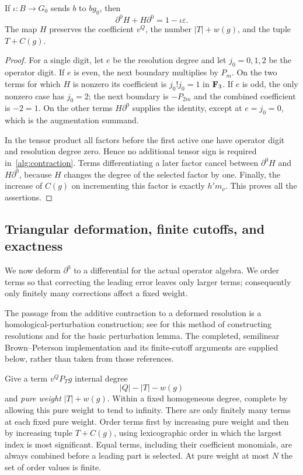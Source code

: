 \begin{lemma}\label{alg:additive-contraction}
If $\iota:B\to G_0$ sends $b$ to $bg_0$, then
\[
 \partial^0H+H\partial^0=1-\iota\varepsilon.
\]
The map $H$ preserves the coefficient $v^Q$, the number
$|T|+w(g)$, and the tuple $T+C(g)$.
\end{lemma}

\begin{proof}
For a single digit, let $e$ be the resolution degree and let
$j_0=0,1,2$ be the operator digit.  If $e$ is even, the next boundary
multiplies by $P_m$.  On the two terms for which $H$ is nonzero its
coefficient is $j_0!j_0=1$ in $\mathbf F_3$.  If $e$ is odd, the only nonzero
case has $j_0=2$; the next boundary is $-P_{2m}$ and the combined
coefficient is $-2=1$.  On the other terms $H\partial^0$ supplies the
identity, except at $e=j_0=0$, which is the augmentation summand.

In the tensor product all factors before the first active one have
operator digit and resolution degree zero.  Hence no additional tensor
sign is required in~\eqref{alg:contraction}.  Terms differentiating a
later factor cancel between $\partial^0H$ and $H\partial^0$, because
$H$ changes the degree of the selected factor by one.  Finally, the
increase of $C(g)$ on incrementing this factor is exactly $h'm_\nu$.
This proves all the assertions.
\end{proof}

\subsection{Triangular deformation, finite cutoffs, and exactness}

We now deform $\partial^0$ to a differential for the actual operator
algebra. We order terms so that correcting the leading error leaves only
larger terms; consequently only finitely many corrections affect a fixed
weight.

The passage from the additive contraction to a deformed resolution is
a homological-perturbation construction; see \cite{Lambe1991} for this
method of constructing resolutions and
\cite[Section~4.8.3, Theorem~51]{RubioSergeraert2013} for the basic
perturbation lemma.  The completed, semilinear Brown--Peterson
implementation and its finite-cutoff arguments are supplied below,
rather than taken from those references.

Give a term $v^QP_Tg$ internal degree
\begin{equation}\label{alg:dual-degree}
 |Q|-|T|-w(g)
\end{equation}
and \emph{pure weight} $|T|+w(g)$.  Within a fixed homogeneous degree,
complete by allowing this pure weight to tend to infinity.  There are
only finitely many terms at each fixed pure weight.  Order terms first
by increasing pure weight and then by increasing tuple $T+C(g)$,
using lexicographic order in which the largest index is most significant.
Equal terms, including their coefficient monomials, are always combined
before a leading part is selected.  At pure weight at most $N$ the set
of order values is finite.

